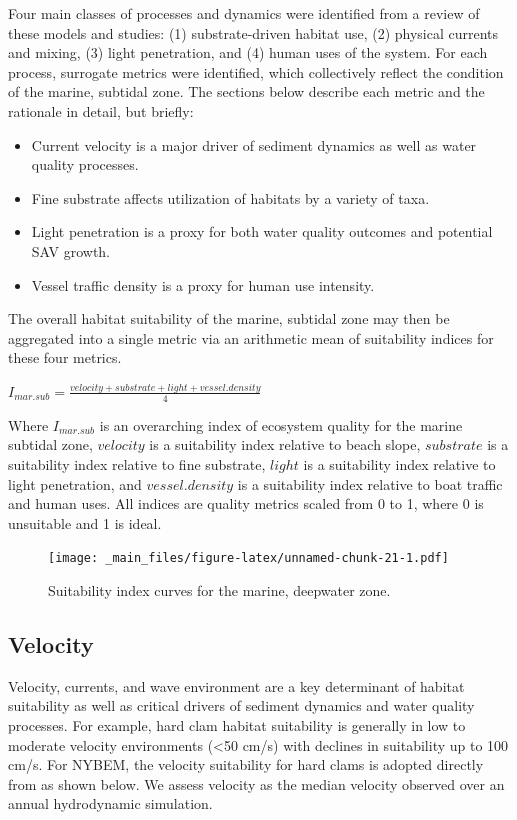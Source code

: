\documentclass[
]{book}
\begin{document}
Four main classes of processes and dynamics were identified from a review of these models and studies: (1) substrate-driven habitat use, (2) physical currents and mixing, (3) light penetration, and (4) human uses of the system. For each process, surrogate metrics were identified, which collectively reflect the condition of the marine, subtidal zone. The sections below describe each metric and the rationale in detail, but briefly:

\begin{itemize}
\item
  Current velocity is a major driver of sediment dynamics as well as water quality processes.
\item
  Fine substrate affects utilization of habitats by a variety of taxa.
\item
  Light penetration is a proxy for both water quality outcomes and potential SAV growth.
\item
  Vessel traffic density is a proxy for human use intensity.
\end{itemize}

The overall habitat suitability of the marine, subtidal zone may then be aggregated into a single metric via an arithmetic mean of suitability indices for these four metrics.

\(I_{mar.sub} = \frac{velocity + substrate + light + vessel.density}{4}\)

Where \(I_{mar.sub}\) is an overarching index of ecosystem quality for the marine subtidal zone, \(velocity\) is a suitability index relative to beach slope, \(substrate\) is a suitability index relative to fine substrate, \(light\) is a suitability index relative to light penetration, and \(vessel.density\) is a suitability index relative to boat traffic and human uses. All indices are quality metrics scaled from 0 to 1, where 0 is unsuitable and 1 is ideal.

\begin{figure}
\centering
\texttt{[image: \_main\_files/figure-latex/unnamed-chunk-21-1.pdf]}
\caption{\label{fig:unnamed-chunk-21}Suitability index curves for the marine, deepwater zone.}
\end{figure}

\hypertarget{velocity}{%
\subsection{Velocity}\label{velocity}}

Velocity, currents, and wave environment are a key determinant of habitat suitability as well as critical drivers of sediment dynamics and water quality processes. For example, hard clam habitat suitability is generally in low to moderate velocity environments (\textless50 cm/s) with declines in suitability up to 100 cm/s. For NYBEM, the velocity suitability for hard clams is adopted directly from \citet{mulholland_habitat_1984-1} as shown below. We assess velocity as the median velocity observed over an annual hydrodynamic simulation.
\end{document}
